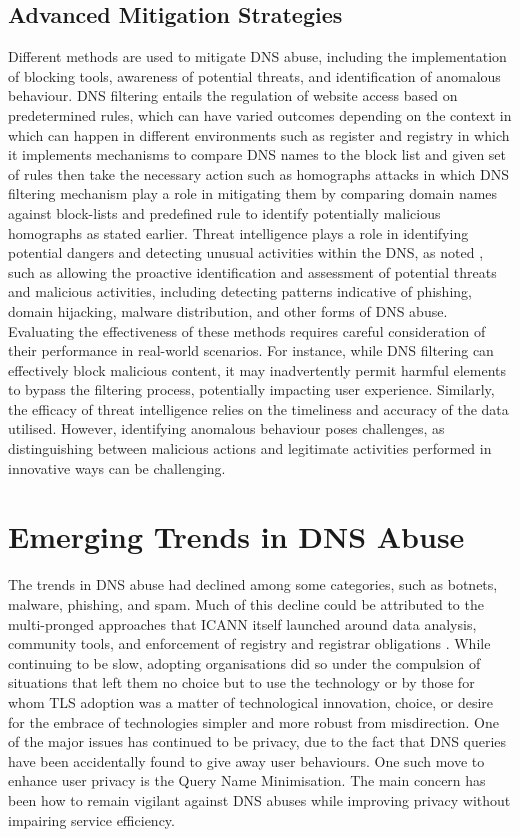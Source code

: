 \subsection{Advanced Mitigation Strategies}

Different methods are used to mitigate DNS abuse, including the implementation of blocking tools, awareness of potential threats, and identification of anomalous behaviour. DNS filtering entails the regulation of website access based on predetermined rules, which can have varied outcomes depending on the context in which can happen in different environments such as register and registry in which it implements mechanisms to compare DNS names to the block list and given set of rules then take the necessary action such as homographs attacks in which DNS filtering mechanism play a role in mitigating them by comparing domain names against block-lists and predefined rule to identify potentially malicious homographs as stated earlier. Threat intelligence plays a role in identifying potential dangers and detecting unusual activities within the DNS, as noted \cite{rizvi2022application}, such as allowing the proactive identification and assessment of potential threats and malicious activities, including detecting patterns indicative of phishing, domain hijacking, malware distribution, and other forms of DNS abuse. Evaluating the effectiveness of these methods requires careful consideration of their performance in real-world scenarios. For instance, while DNS filtering can effectively block malicious content, it may inadvertently permit harmful elements to bypass the filtering process, potentially impacting user experience. Similarly, the efficacy of threat intelligence relies on the timeliness and accuracy of the data utilised. However, identifying anomalous behaviour poses challenges, as distinguishing between malicious actions and legitimate activities performed in innovative ways can be challenging.


\section{Emerging Trends in DNS Abuse}

The trends in DNS abuse had declined among some categories, such as botnets, malware, phishing, and spam. Much of this decline could be attributed to the multi-pronged approaches that ICANN itself launched around data analysis, community tools, and enforcement of registry and registrar obligations \cite{icann_dns_security_threat}. While continuing to be slow, adopting organisations did so under the compulsion of situations that left them no choice but to use the technology or by those for whom TLS adoption was a matter of technological innovation, choice, or desire for the embrace of technologies simpler and more robust from misdirection. One of the major issues has continued to be privacy, due to the fact that DNS queries have been accidentally found to give away user behaviours. One such move to enhance user privacy is the Query Name Minimisation. The main concern has been how to remain vigilant against DNS abuses while improving privacy without impairing service efficiency.

